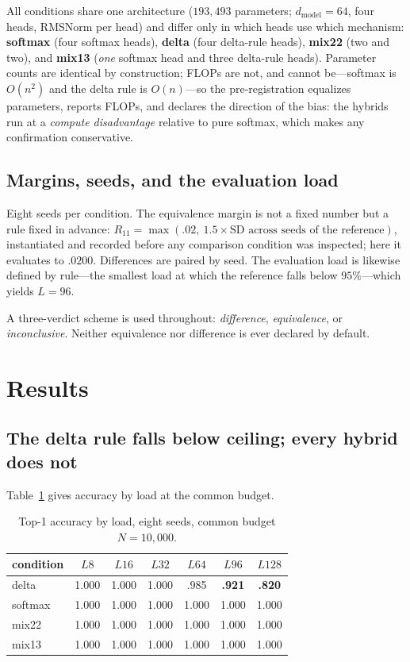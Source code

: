 \documentclass{article}
\begin{document}
All conditions share one architecture ($193{,}493$ parameters; $d_{\text{model}}=64$, four heads,
RMSNorm per head) and differ only in which heads use which mechanism: \textbf{softmax} (four softmax heads),
\textbf{delta} (four delta-rule heads), \textbf{mix22} (two and two), and \textbf{mix13}
(\emph{one} softmax head and three delta-rule heads). Parameter counts are identical by
construction; FLOPs are not, and cannot be---softmax is $O(n^2)$ and the delta rule is
$O(n)$---so the pre-registration equalizes parameters, reports FLOPs, and declares the
direction of the bias: the hybrids run at a \emph{compute disadvantage} relative to pure
softmax, which makes any confirmation conservative.

\subsection{Margins, seeds, and the evaluation load}

Eight seeds per condition. The equivalence margin is not a fixed number but a rule fixed in
advance: $R_{11} = \max(.02,\ 1.5\times \text{SD across seeds of the reference})$, instantiated
and recorded before any comparison condition was inspected; here it evaluates to $.0200$.
Differences are paired by seed. The evaluation load is likewise defined by rule---the smallest
load at which the reference falls below $95\%$---which yields $L=96$.

A three-verdict scheme is used throughout: \emph{difference}, \emph{equivalence}, or
\emph{inconclusive}. Neither equivalence nor difference is ever declared by default.

\section{Results}

\subsection{The delta rule falls below ceiling; every hybrid does not}

Table~\ref{tab:main} gives accuracy by load at the common budget.

\begin{table}[htbp]
\centering
\caption{Top-1 accuracy by load, eight seeds, common budget $N=10{,}000$.}
\label{tab:main}
\begin{tabular}{lcccccc}
\toprule
condition & $L8$ & $L16$ & $L32$ & $L64$ & $L96$ & $L128$ \\
\midrule
delta   & 1.000 & 1.000 & 1.000 & .985 & \textbf{.921} & \textbf{.820} \\
softmax & 1.000 & 1.000 & 1.000 & 1.000 & 1.000 & 1.000 \\
mix22   & 1.000 & 1.000 & 1.000 & 1.000 & 1.000 & 1.000 \\
mix13   & 1.000 & 1.000 & 1.000 & 1.000 & 1.000 & 1.000 \\
\bottomrule
\end{tabular}
\end{table}
\end{document}
